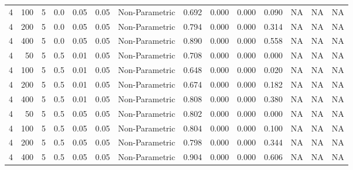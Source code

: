\begin{table}
{{\begin{tabular}{rrrrrrllllllll}
\hspace{1em}4 & 100 & 5 & 0.0 & 0.05 & 0.05 & Non-Parametric & 0.692 & 0.000 & 0.000 & 0.090 & NA & NA & NA\\
\hspace{1em}4 & 200 & 5 & 0.0 & 0.05 & 0.05 & Non-Parametric & 0.794 & 0.000 & 0.000 & 0.314 & NA & NA & NA\\
\hspace{1em}4 & 400 & 5 & 0.0 & 0.05 & 0.05 & Non-Parametric & 0.890 & 0.000 & 0.000 & 0.558 & NA & NA & NA\\
\hspace{1em}4 & 50 & 5 & 0.5 & 0.01 & 0.05 & Non-Parametric & 0.708 & 0.000 & 0.000 & 0.000 & NA & NA & NA\\
\hspace{1em}4 & 100 & 5 & 0.5 & 0.01 & 0.05 & Non-Parametric & 0.648 & 0.000 & 0.000 & 0.020 & NA & NA & NA\\
\hspace{1em}4 & 200 & 5 & 0.5 & 0.01 & 0.05 & Non-Parametric & 0.674 & 0.000 & 0.000 & 0.182 & NA & NA & NA\\
\hspace{1em}4 & 400 & 5 & 0.5 & 0.01 & 0.05 & Non-Parametric & 0.808 & 0.000 & 0.000 & 0.380 & NA & NA & NA\\
\hspace{1em}4 & 50 & 5 & 0.5 & 0.05 & 0.05 & Non-Parametric & 0.802 & 0.000 & 0.000 & 0.000 & NA & NA & NA\\
\hspace{1em}4 & 100 & 5 & 0.5 & 0.05 & 0.05 & Non-Parametric & 0.804 & 0.000 & 0.000 & 0.100 & NA & NA & NA\\
\hspace{1em}4 & 200 & 5 & 0.5 & 0.05 & 0.05 & Non-Parametric & 0.798 & 0.000 & 0.000 & 0.344 & NA & NA & NA\\
\hspace{1em}4 & 400 & 5 & 0.5 & 0.05 & 0.05 & Non-Parametric & 0.904 & 0.000 & 0.000 & 0.606 & NA & NA & NA\\
\bottomrule
\end{tabular}
}}
 \end{table}
